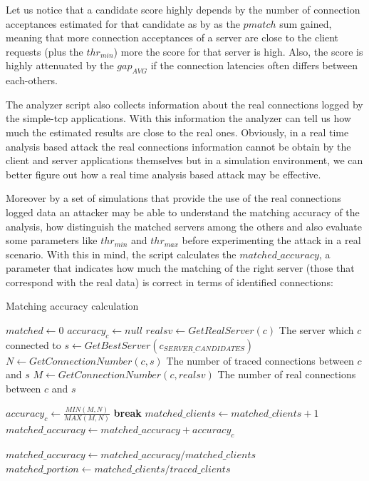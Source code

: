 Let us notice that a candidate score highly depends by the number of connection                 %
acceptances estimated for that candidate as by as the $pmatch$ sum gained,
meaning that more connection acceptances of a server are close to the client
requests (plus the $thr_{min}$) more the score for that server is high.
Also, the score is highly attenuated by the $gap_{AVG}$ if the connection
latencies often differs between each-others.


The analyzer script also collects information about the
real connections logged by the simple-tcp applications. With this
information the analyzer can tell us how much the estimated results are
close to the real ones. Obviously, in a real time analysis based attack the real connections
information cannot be obtain by the client and server applications themselves                   %
but in a simulation environment, we can better figure out how a real                            %
time analysis based attack may be effective.

Moreover by a set of simulations
that provide the use of the real connections logged data an attacker
may be able to understand the matching accuracy of the analysis, how distinguish the
matched servers among the others and also evaluate some
parameters like $thr_{min}$ and $thr_{max}$ before 
experimenting the attack in a real scenario. 
With this in mind, the script
calculates the $matched\_accuracy$, a parameter that indicates how much
the matching of the right server (those that correspond with the real
data) is correct in terms of identified
connections:

\begin{algorithm}[H]
\caption{Matching accuracy calculation}
\begin{algorithmic}
\State $matched \gets 0$
	\State $accuracy_c \gets null$
	\State $realsv \gets GetRealServer(c)$ 
	{\footnotesize \Comment The server which $c$ connected to}
	\State $s \gets GetBestServer(c_{SERVER\_CANDIDATES})$
		\State $N \gets GetConnectionNumber(c, s) $ 
		{\footnotesize \Comment The number of traced connections between $c$ and $s$}
		\State $M \gets GetConnectionNumber(c, realsv)$ 
		{\footnotesize \Comment The number of real connections between $c$ and $s$}

		\State $accuracy_c \gets \frac{ MIN(M, N)}{MAX(M, N)}$
	\State \textbf{break}
	\EndIf
		\State $matched\_clients \gets matched\_clients + 1$
		\State $matched\_accuracy \gets matched\_accuracy + accuracy_c$
	\EndIf	
\EndFor

\State $matched\_accuracy \gets matched\_accuracy / matched\_clients$
\State $matched\_portion \gets matched\_clients / traced\_clients$

\end{algorithmic}
\label{alg:maccuracy}
\end{algorithm}
 
